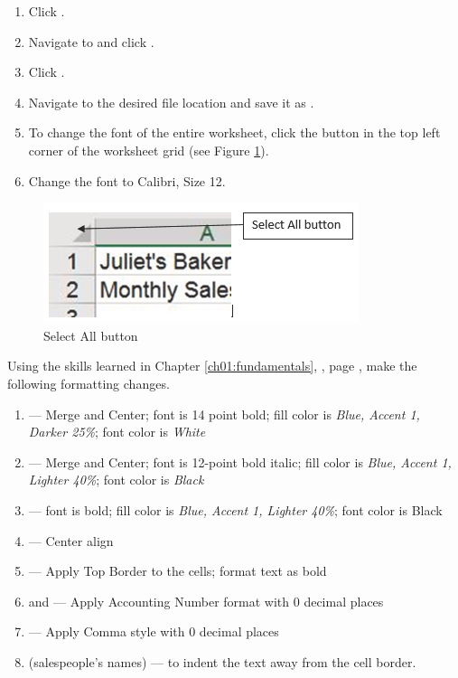 \begin{enumbox}
	\begin{enumerate}
		\item Click .
		\item Navigate to  and click .
		\item Click .
		\item Navigate to the desired file location and save it as .
		\item To change the font of the entire worksheet, click the  button in the top left corner of the worksheet grid (see Figure \ref{02:fig41}).
		\item Change the font to Calibri, Size 12.
	\end{enumerate}
\end{enumbox}

\begin{figure}[H]
	\centering
	\includegraphics[width=\maxwidth{.95\linewidth}]{gfx/ch02_fig41}
	\caption{Select All button}
	\label{02:fig41}
\end{figure}

Using the skills learned in Chapter \ref{ch01:fundamentals}, , page \pageref{ch01:fundamentals}, make the following formatting changes.

\begin{enumbox}
	\begin{enumerate}
		\item {} --- Merge and Center; font is 14 point bold; fill color is \textit{Blue, Accent 1, Darker 25\%}; font color is \textit{White}
		\item {} --- Merge and Center; font is 12-point bold italic; fill color is \textit{Blue, Accent 1, Lighter 40\%}; font color is \textit{Black}
		\item {} --- font is bold; fill color is \textit{Blue, Accent 1, Lighter 40\%}; font color is Black
		\item {} --- Center align
		\item {} --- Apply Top Border to the cells; format text as bold
		\item {} and  --- Apply Accounting Number format with $ 0 $ decimal places
		\item {} --- Apply Comma style with $ 0 $ decimal places
		\item {} (salespeople's names) ---  to indent the text away from the cell border.
	\end{enumerate}
\end{enumbox}

